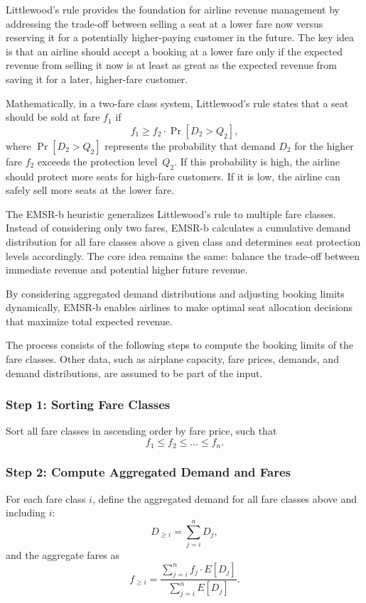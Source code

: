 \documentclass{article}
\begin{document}
Littlewood’s rule provides the foundation for airline revenue management by 
addressing the trade-off between selling a seat at a lower fare now versus 
reserving it for a potentially higher-paying customer in the future. The key 
idea is that an airline should accept a booking at a lower fare only if the 
expected revenue from selling it now is at least as great as the expected 
revenue from saving it for a later, higher-fare customer.

Mathematically, in a two-fare class system, Littlewood’s rule states that a seat 
should be sold at fare $f_1$ if
\[
    f_1 \geq f_2\cdot \Pr[D_2 > Q_2],
\]
where $\Pr[D_2 > Q_2]$ represents the probability that demand $D_2$ for the 
higher fare $f_2$ exceeds the protection level~$Q_2$. If this probability is 
high, the airline should protect more seats for high-fare customers. If it is 
low, the airline can safely sell more seats at the lower fare.

The EMSR-b heuristic generalizes Littlewood’s rule to multiple fare classes. 
Instead of considering only two fares, EMSR-b calculates a cumulative demand 
distribution for all fare classes above a given class and determines seat 
protection levels accordingly. The core idea remains the same: balance the 
trade-off between immediate revenue and potential higher future revenue.

By considering aggregated demand distributions and adjusting booking limits 
dynamically, EMSR-b enables airlines to make optimal seat allocation decisions 
that maximize total expected revenue.

The process consists of the following steps to compute the booking limits of the 
fare classes. Other data, such as airplane capacity, fare prices, demands, and 
demand distributions, are assumed to be part of the input.

\subsubsection*{Step 1: Sorting Fare Classes}
Sort all fare classes in ascending order by fare price, such that
\[
    f_1 \leq f_2 \leq \dots \leq f_n.
\]

\subsubsection*{Step 2: Compute Aggregated Demand and Fares}
For each fare class $i$, define the aggregated demand for all fare classes above 
and including $i$:
\[
    D_{\geq i} = \sum_{j=i}^{n} D_j,
\]
and the aggregate fares as
\[
    f_{\geq i} =  \frac{\sum_{j=i}^{n} f_j \cdot E[D_j]}{\sum_{j=i}^{n} E[D_j]}.
\]
\end{document}
